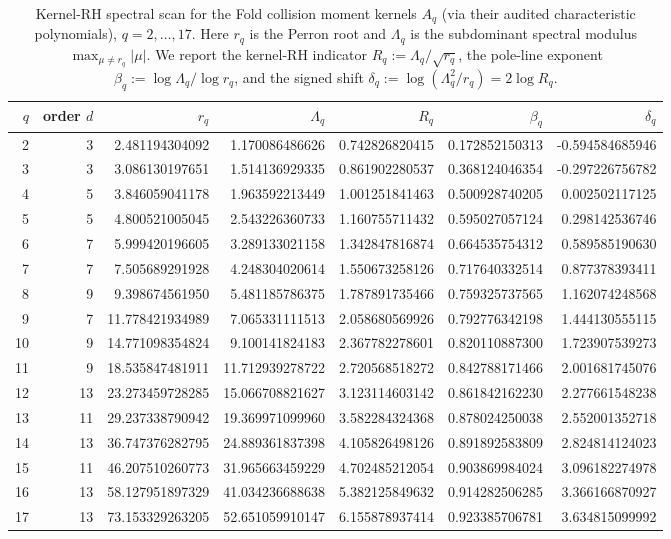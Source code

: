 \begin{table}[H]
\centering
\scriptsize
\setlength{\tabcolsep}{5pt}
\caption{Kernel-RH spectral scan for the Fold collision moment kernels $A_q$ (via their audited characteristic polynomials), $q=2,\dots,17$. Here $r_q$ is the Perron root and $\Lambda_q$ is the subdominant spectral modulus $\max_{\mu\ne r_q}|\mu|$. We report the kernel-RH indicator $R_q:=\Lambda_q/\sqrt{r_q}$, the pole-line exponent $\beta_q:=\log\Lambda_q/\log r_q$, and the signed shift $\delta_q:=\log(\Lambda_q^2/r_q)=2\log R_q$.}
\label{tab:fold_collision_kernel_rh_scan_q2_17}
\begin{tabular}{r r r r r r r}
\toprule
$q$ & order $d$ & $r_q$ & $\Lambda_q$ & $R_q$ & $\beta_q$ & $\delta_q$\\
\midrule
2 & 3 & 2.481194304092 & 1.170086486626 & 0.742826820415 & 0.172852150313 & -0.594584685946\\
3 & 3 & 3.086130197651 & 1.514136929335 & 0.861902280537 & 0.368124046354 & -0.297226756782\\
4 & 5 & 3.846059041178 & 1.963592213449 & 1.001251841463 & 0.500928740205 & 0.002502117125\\
5 & 5 & 4.800521005045 & 2.543226360733 & 1.160755711432 & 0.595027057124 & 0.298142536746\\
6 & 7 & 5.999420196605 & 3.289133021158 & 1.342847816874 & 0.664535754312 & 0.589585190630\\
7 & 7 & 7.505689291928 & 4.248304020614 & 1.550673258126 & 0.717640332514 & 0.877378393411\\
8 & 9 & 9.398674561950 & 5.481185786375 & 1.787891735466 & 0.759325737565 & 1.162074248568\\
9 & 7 & 11.778421934989 & 7.065331111513 & 2.058680569926 & 0.792776342198 & 1.444130555115\\
10 & 9 & 14.771098354824 & 9.100141824183 & 2.367782278601 & 0.820110887300 & 1.723907539273\\
11 & 9 & 18.535847481911 & 11.712939278722 & 2.720568518272 & 0.842788171466 & 2.001681745076\\
12 & 13 & 23.273459728285 & 15.066708821627 & 3.123114603142 & 0.861842162230 & 2.277661548238\\
13 & 11 & 29.237338790942 & 19.369971099960 & 3.582284324368 & 0.878024250038 & 2.552001352718\\
14 & 13 & 36.747376282795 & 24.889361837398 & 4.105826498126 & 0.891892583809 & 2.824814124023\\
15 & 11 & 46.207510260773 & 31.965663459229 & 4.702485212054 & 0.903869984024 & 3.096182274978\\
16 & 13 & 58.127951897329 & 41.034236688638 & 5.382125849632 & 0.914282506285 & 3.366166870927\\
17 & 13 & 73.153329263205 & 52.651059910147 & 6.155878937414 & 0.923385706781 & 3.634815099992\\
\bottomrule
\end{tabular}
\end{table}
